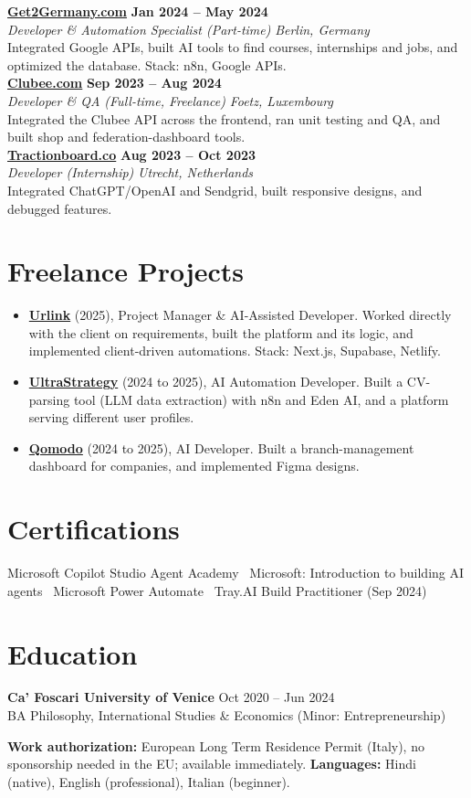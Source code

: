 \documentclass[a4paper,10pt]{article}
\newcommand{\role}[4]{%
 \textbf{#1} \hfill \textbf{#2}\\[1pt]%
 \textit{#3} \hfill \textit{#4}\\[2pt]%
}
\begin{document}
\role{\href{https://get2germany.com}{Get2Germany.com}}{Jan 2024 -- May 2024}{Developer \& Automation Specialist (Part-time)}{Berlin, Germany}
Integrated Google APIs, built AI tools to find courses, internships and jobs, and optimized the database. Stack: n8n, Google APIs.\\[1pt]

\role{\href{https://clubee.com}{Clubee.com}}{Sep 2023 -- Aug 2024}{Developer \& QA (Full-time, Freelance)}{Foetz, Luxembourg}
Integrated the Clubee API across the frontend, ran unit testing and QA, and built shop and federation-dashboard tools.\\[1pt]

\role{\href{https://tractionboard.co}{Tractionboard.co}}{Aug 2023 -- Oct 2023}{Developer (Internship)}{Utrecht, Netherlands}
Integrated ChatGPT/OpenAI and Sendgrid, built responsive designs, and debugged features.

\section{Freelance Projects}
\begin{itemize}
 \item \textbf{\href{https://smarturlink.com/}{Urlink}} (2025), Project Manager \& AI-Assisted Developer. Worked directly with the client on requirements, built the platform and its logic, and implemented client-driven automations. Stack: Next.js, Supabase, Netlify.
 \item \textbf{\href{https://ultrastrategy.com}{UltraStrategy}} (2024 to 2025), AI Automation Developer. Built a CV-parsing tool (LLM data extraction) with n8n and Eden AI, and a platform serving different user profiles.
 \item \textbf{\href{https://www.qomodo.me/}{Qomodo}} (2024 to 2025), AI Developer. Built a branch-management dashboard for companies, and implemented Figma designs.
\end{itemize}

\section{Certifications}
Microsoft Copilot Studio Agent Academy \textbullet\ Microsoft: Introduction to building AI agents \textbullet\ Microsoft Power Automate \textbullet\ Tray.AI Build Practitioner (Sep 2024)

\section{Education}
\textbf{Ca' Foscari University of Venice} \hfill Oct 2020 -- Jun 2024\\
BA Philosophy, International Studies \& Economics (Minor: Entrepreneurship)

\vspace{2pt}
{\small \textbf{Work authorization:} European Long Term Residence Permit (Italy), no sponsorship needed in the EU; available immediately. \quad \textbf{Languages:} Hindi (native), English (professional), Italian (beginner).}
\end{document}
